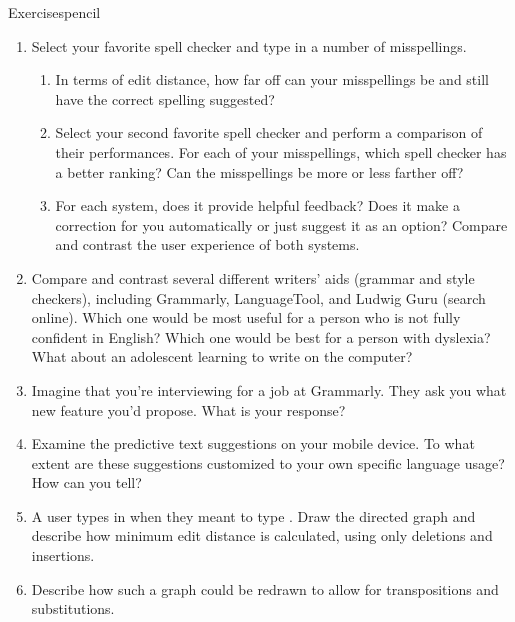 \begin{tblsfilledsymbol}{Exercises}{pencil}
\begin{enumerate}
\item  Select your favorite spell checker and type in a number of misspellings.
  \begin{enumerate}
  \item In terms of edit distance, how far off can your misspellings
    be and still have the correct spelling suggested?
  \item Select your second favorite spell checker and perform a
    comparison of their performances.  For each of your misspellings,    which spell checker has a better ranking?  Can the misspellings be  more or less farther off? 
    \item For each system, does it provide helpful feedback?  Does it make a correction for you automatically or just suggest it as an option? Compare and contrast the user experience of both systems.
  \end{enumerate}

\item Compare and contrast several different writers' aids (grammar and style checkers), including Grammarly, LanguageTool, and Ludwig Guru (search online).  Which one would be most useful for a person who is not fully confident in English?  Which one would be best for a person with dyslexia?  What about an adolescent learning to write on the computer?

\item Imagine that you're interviewing for a job at Grammarly.  They ask you what new feature you'd propose.  What is your response?

\item Examine the predictive text suggestions on your mobile device.  To what extent are these suggestions customized to your own specific language usage?  How can you tell?



\item  A user types in  when they meant to  type .  Draw the directed graph and describe how  minimum edit distance is calculated, using only deletions and insertions.
\item  Describe how such a graph could be redrawn to  allow for transpositions and substitutions.  





\end{enumerate}
\end{tblsfilledsymbol}
